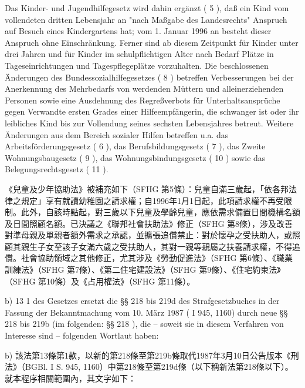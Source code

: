 \documentclass[12pt]{article}
\begin{document}
\begin{sourcepara}[title={原文理由 A.II.3.a 續}]
Das Kinder- und Jugendhilfegesetz wird dahin ergänzt (\abbrArt{} 5 \abbrSFHG{}), daß ein Kind vom vollendeten dritten Lebensjahr an "nach Maßgabe des Landesrechts" Anspruch auf Besuch eines Kindergartens hat; vom 1. Januar 1996 an besteht dieser Anspruch ohne Einschränkung. Ferner sind ab diesem Zeitpunkt für Kinder unter drei Jahren und für Kinder im schulpflichtigen Alter nach Bedarf Plätze in Tageseinrichtungen und Tagespflegeplätze vorzuhalten. Die beschlossenen Änderungen des Bundessozialhilfegesetzes (\abbrArt{} 8 \abbrSFHG{}) betreffen Verbesserungen bei der Anerkennung des Mehrbedarfs von werdenden Müttern und alleinerziehenden Personen sowie eine Ausdehnung des Regreßverbots für Unterhaltsansprüche gegen Verwandte ersten Grades einer Hilfeempfängerin, die schwanger ist oder ihr leibliches Kind bis zur Vollendung seines sechsten Lebensjahres betreut. Weitere Änderungen aus dem Bereich sozialer Hilfen betreffen u.a. das Arbeitsförderungsgesetz (\abbrArt{} 6 \abbrSFHG{}), das Berufsbildungsgesetz (\abbrArt{} 7 \abbrSFHG{}), das Zweite Wohnungsbaugesetz (\abbrArt{} 9 \abbrSFHG{}), das Wohnungsbindungsgesetz (\abbrArt{} 10 \abbrSFHG{}) sowie das Belegungsrechtsgesetz (\abbrArt{} 11 \abbrSFHG{}).
\end{sourcepara}
\begin{transpara}
《兒童及少年協助法》被補充如下（SFHG 第5條）：兒童自滿三歲起，「依各邦法律之規定」享有就讀幼稚園之請求權；自1996年1月1日起，此項請求權不再受限制。此外，自該時點起，對三歲以下兒童及學齡兒童，應依需求備置日間機構名額及日間照顧名額。已決議之《聯邦社會扶助法》修正（SFHG 第8條），涉及改善對準母親及單親者額外需求之承認，並擴張追償禁止：對於懷孕之受扶助人，或照顧其親生子女至該子女滿六歲之受扶助人，其對一親等親屬之扶養請求權，不得追償。社會協助領域之其他修正，尤其涉及《勞動促進法》（SFHG 第6條）、《職業訓練法》（SFHG 第7條）、《第二住宅建設法》（SFHG 第9條）、《住宅約束法》（SFHG 第10條）及《占用權法》（SFHG 第11條）。
\end{transpara}

\begin{sourcepara}[title={原文理由 A.II.3.b}]
b) \abbrArt{} 13 \abbrNr{} 1 des Gesetzes ersetzt die §§ 218 bis 219d des Strafgesetzbuches in der Fassung der Bekanntmachung vom 10. März 1987 (\abbrBGBl{} I \abbrS{} 945, 1160) durch neue §§ 218 bis 219b (im folgenden: §§ 218 \abbrFF{} \abbrStGB{} \abbrNF{}), die -- soweit sie in diesem Verfahren von Interesse sind -- folgenden Wortlaut haben:
\end{sourcepara}
\begin{transpara}
b) 該法第13條第1款，以新的第218條至第219b條取代1987年3月10日公告版本《刑法》（BGBl. I S. 945, 1160）中第218條至第219d條（以下稱新法第218條以下）。就本程序相關範圍內，其文字如下：
\end{transpara}
\end{document}
